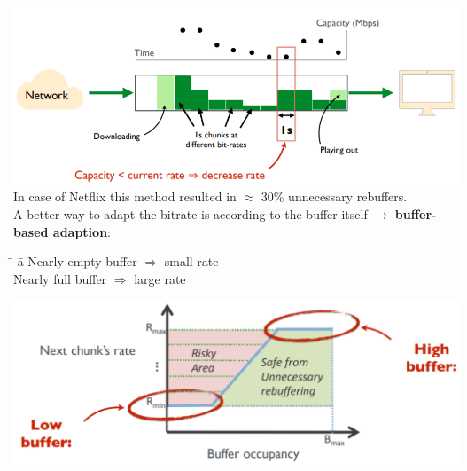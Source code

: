 \documentclass[a4paper, fontsize=8pt, landscape, DIV=1]{scrartcl}
\begin{document}
\begin{multicols*}{4}
		\includegraphics[width=\columnwidth]{images/Application_Layer/adaption_capacity.png}
		In case of Netflix this method resulted in $\approx$ 30\% unnecessary
		rebuffers.\\
		A better way to adapt the bitrate is according to the buffer itself
		$\rightarrow$ \textbf{buffer-based adaption}:
		\begin{tabbing}
			\hspace{3cm} \= \hspace{1cm} \=  a \kill
			Nearly empty buffer \> $\Rightarrow$ \> small rate \\
			Nearly full buffer \> $\Rightarrow$ \> large rate
		\end{tabbing}
		
		\includegraphics[width=\columnwidth]{images/Application_Layer/buffer_adaption.png}
		

\end{multicols*}
\end{document}
